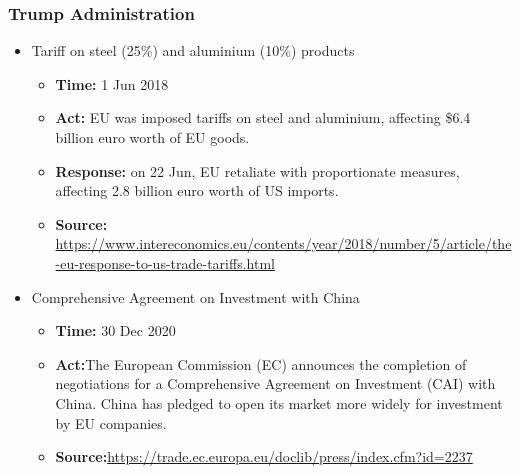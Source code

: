 		\subsubsection{Trump Administration}
			\begin{itemize}
			\item	Tariff on steel (25\%) and aluminium (10\%) products
				\begin{itemize}
				\item \textbf{Time: }1 Jun 2018
				\item \textbf{Act: } EU was imposed tariffs on steel and aluminium, affecting \$6.4 billion euro worth of EU goods.
				\item \textbf{Response: } on 22 Jun, EU retaliate with proportionate measures, affecting 2.8 billion euro worth of US imports.
				\item	\textbf{Source: } \url{https://www.intereconomics.eu/contents/year/2018/number/5/article/the-eu-response-to-us-trade-tariffs.html}
				\end{itemize}
				
			\item Comprehensive Agreement on Investment with China
				\begin{itemize}
				\item \textbf{Time:} 30 Dec 2020
				\item \textbf{Act:}The European Commission (EC) announces the completion of negotiations for a Comprehensive Agreement on Investment (CAI) with China. China has pledged to open its market more widely for investment by EU companies.
				\item \textbf{Source:}\url{https://trade.ec.europa.eu/doclib/press/index.cfm?id=2237}
				\end{itemize}
			\end{itemize}
			
